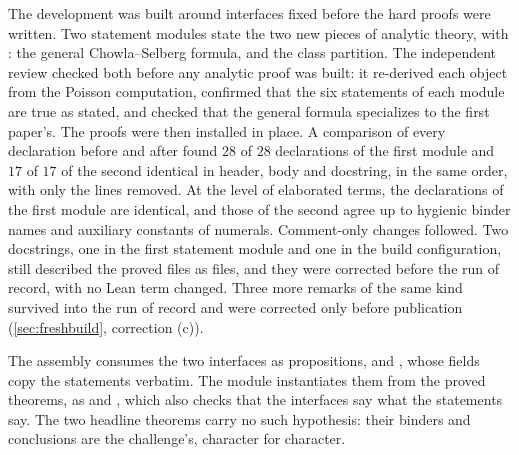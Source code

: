 \documentclass[11pt]{article}
\theoremstyle{definition}
\begin{document}
{The development was built around interfaces fixed before the hard proofs were written. Two statement modules state the two new pieces of analytic theory, with :  the general Chowla--Selberg formula, and  the class partition. The independent review checked both before any analytic proof was built: it re-derived each object from the Poisson computation, confirmed that the six statements of each module are true as stated, and checked that the general formula specializes to the first paper's. The proofs were then installed in place. A comparison of every declaration before and after found $28$ of $28$ declarations of the first module and $17$ of $17$ of the second identical in header, body and docstring, in the same order, with only the  lines removed. At the level of elaborated terms, the declarations of the first module are identical, and those of the second agree up to hygienic binder names and auxiliary constants of numerals. Comment-only changes followed. Two docstrings, one in the first statement module and one in the build configuration, still described the proved files as  files, and they were corrected before the run of record, with no Lean term changed. Three more remarks of the same kind survived into the run of record and were corrected only before publication (\cref{sec:freshbuild}, correction (c)).

The assembly consumes the two interfaces as propositions,  and , whose fields copy the statements verbatim. The module  instantiates them from the proved theorems, as  and , which also checks that the interfaces say what the statements say. The two headline theorems carry no such hypothesis: their binders and conclusions are the challenge's, character for character.

}
\end{document}
